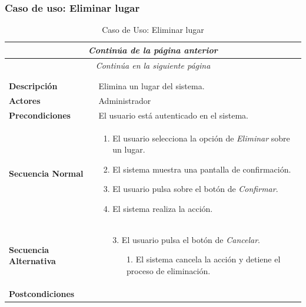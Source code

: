 \newpage
\subsubsection*{Caso de uso: Eliminar lugar }
\begin{longtable}{| p{4cm} | p{10cm} |}
\endfirsthead
\multicolumn{2}{c}{\textit{Continúa de la página anterior}}\\[12pt]
\hline
\endhead
\hline
\multicolumn{2}{c}{\textit{Continúa en la siguiente página}} \\
\endfoot
\hline
\caption{Caso de Uso: Eliminar lugar}\label{fig:1}\\
\endlastfoot


\hline
\multicolumn{2}{|c|}{\textbf{CU$<$36$>$ - Eliminar Lugar}} \\

\hline
\textbf{Descripción} &
Elimina un lugar del sistema.\\

\hline
\textbf{Actores} &
Administrador\\

\hline
\textbf{Precondiciones} &
El usuario está autenticado en el sistema.\\

\hline
\textbf{Secuencia Normal} &\mbox{}\par\vspace{-\baselineskip}
\begin{enumerate}[leftmargin=0.7cm, topsep=0.1cm]
\item El usuario selecciona la opción de \textit{Eliminar} sobre un lugar.
\item El sistema muestra una pantalla de confirmación.
\item El usuario pulsa sobre el botón de \textit{Confirmar}.
\item El sistema realiza la acción.
\end{enumerate}


\\
\hline
\textbf{Secuencia Alternativa} &\mbox{}\par\vspace{-\baselineskip}
\begin{enumerate}[leftmargin=0.9cm, topsep=0.1cm]
\item[3.] El usuario pulsa el botón de \textit{Cancelar}.
	\begin{itemize}
	\item[1.] El sistema cancela la acción y detiene el proceso de eliminación.
	\end{itemize}
\end{enumerate}
\\

\hline
\textbf{Postcondiciones} & \\
\hline
\end{longtable}




